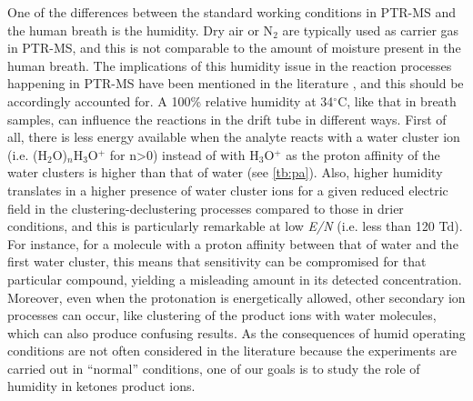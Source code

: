 One of the differences between the standard working conditions in PTR-MS and the human breath is the humidity. 
Dry air or N$_2$ are typically used as carrier gas in PTR-MS, and this is not comparable to the amount of moisture present in the human breath. 
The implications of this humidity issue in the reaction processes happening in PTR-MS have been mentioned in the literature  \cite{warneke2001measurements,tani2003measurement,tani2004effect}, and this should be accordingly accounted for. 
A 100\% relative humidity at 34$^{\circ}$C, like that in breath samples, can influence the reactions in the drift tube in different ways.
First of all, there is less energy available when the analyte reacts with a water cluster ion (i.e. (H$_2$O)$_n$H$_3$O$^+$ for n>0) instead of with H$_3$O$^+$ as the proton affinity of the water clusters is higher than that of water (see \autoref{tb:pa}). Also, higher humidity translates in a higher presence of water cluster ions for a given reduced electric field in the clustering-declustering processes compared to those in drier conditions,
and this is particularly remarkable at low \textit{E/N} (i.e. less than 120 Td). For instance, for a molecule with a proton affinity between that of water and the first water cluster, this means that sensitivity can be compromised for that particular compound, yielding a misleading amount in its detected concentration. Moreover, even when the protonation is energetically allowed, other secondary ion processes can occur, like clustering of the product ions with water molecules, which can also produce confusing results.
As the  consequences of humid operating conditions are not often considered in the literature because the experiments are carried out in “normal”  conditions, one of our goals is to study the role of humidity in ketones product ions.


